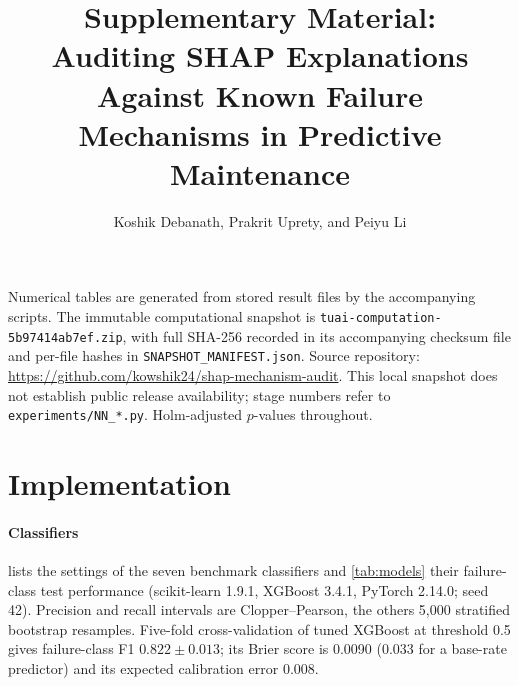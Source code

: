 \documentclass[10pt]{article}
\title{Supplementary Material:\\Auditing SHAP Explanations Against Known Failure Mechanisms in Predictive Maintenance}
\author{Koshik Debanath, Prakrit Uprety, and Peiyu Li}
\date{}
\begin{document}
\maketitle

Numerical tables are generated from stored result files by the accompanying scripts. The immutable computational snapshot is \texttt{tuai-computation-5b97414ab7ef.zip}, with full SHA-256 recorded in its accompanying checksum file and per-file hashes in \texttt{SNAPSHOT\_MANIFEST.json}. Source repository: \url{https://github.com/kowshik24/shap-mechanism-audit}. This local snapshot does not establish public release availability; stage numbers refer to \texttt{experiments/NN\_*.py}. Holm-adjusted $p$-values throughout.

\section{Implementation}

\paragraph{Classifiers}  lists the settings of the seven benchmark classifiers and \cref{tab:models} their failure-class test performance (scikit-learn 1.9.1, XGBoost 3.4.1, PyTorch 2.14.0; seed 42). Precision and recall intervals are Clopper--Pearson, the others 5{,}000 stratified bootstrap resamples. Five-fold cross-validation of tuned XGBoost at threshold 0.5 gives failure-class F1 $0.822\pm0.013$; its Brier score is 0.0090 (0.033 for a base-rate predictor) and its expected calibration error 0.008.

\begin{table}[htbp]
\centering
\caption{Classifier settings.}
\label{tab:config}
\small

\end{table}

\begin{table}[htbp]
\centering
\caption{Failure-class test performance, sorted by F1; parentheses: 95\% bootstrap interval for F1.}
\label{tab:models}
\small

\end{table}
\end{document}
